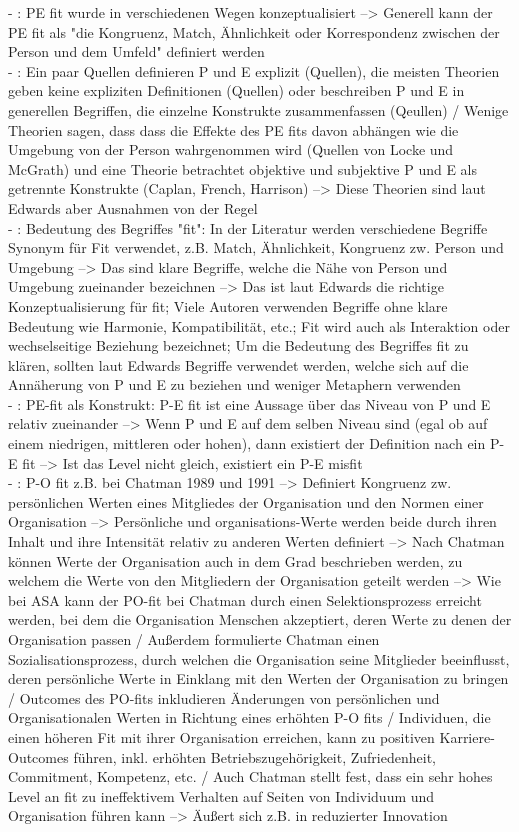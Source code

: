 - \cite[S. 3]{edwards:2007}: PE fit wurde in verschiedenen Wegen konzeptualisiert --> Generell kann der PE fit als "die Kongruenz, Match, Ähnlichkeit oder Korrespondenz zwischen der Person und dem Umfeld" definiert werden\\
- \cite[S. 49]{edwards:2008}: Ein paar Quellen definieren P und E explizit (Quellen), die meisten Theorien geben keine expliziten Definitionen (Quellen) oder beschreiben P und E in generellen Begriffen, die einzelne Konstrukte zusammenfassen (Qeullen) / Wenige Theorien sagen, dass dass die Effekte des PE fits davon abhängen wie die Umgebung von der Person wahrgenommen wird (Quellen von Locke und McGrath) und eine Theorie betrachtet objektive und subjektive P und E als getrennte Konstrukte (Caplan, French, Harrison) --> Diese Theorien sind laut Edwards aber Ausnahmen von der Regel \\
- \cite[S. 53]{edwards:2008}: Bedeutung des Begriffes "fit": In der Literatur werden verschiedene Begriffe Synonym für Fit verwendet, z.B. Match, Ähnlichkeit, Kongruenz zw. Person und Umgebung --> Das sind klare Begriffe, welche die Nähe von Person und Umgebung zueinander bezeichnen --> Das ist laut Edwards die richtige Konzeptualisierung für fit; Viele Autoren verwenden Begriffe ohne klare Bedeutung wie Harmonie, Kompatibilität, etc.; Fit wird auch als Interaktion oder wechselseitige Beziehung bezeichnet; Um die Bedeutung des Begriffes fit zu klären, sollten laut Edwards Begriffe verwendet werden, welche sich auf die Annäherung von P und E zu beziehen und weniger Metaphern verwenden \\
- \cite[S. 53]{edwards:2008}: PE-fit als Konstrukt: P-E fit ist eine Aussage über das Niveau von P und E relativ zueinander --> Wenn P und E auf dem selben Niveau sind (egal ob auf einem niedrigen, mittleren oder hohen), dann existiert der Definition nach ein P-E fit --> Ist das Level nicht gleich, existiert ein P-E misfit \\
- \cite[S. 4]{su:2015}: P-O fit z.B. bei Chatman 1989 und 1991 --> Definiert Kongruenz zw. persönlichen Werten eines Mitgliedes der Organisation und den Normen einer Organisation --> Persönliche und organisations-Werte werden beide durch ihren Inhalt und ihre Intensität relativ zu anderen Werten definiert --> Nach Chatman können Werte der Organisation auch in dem Grad beschrieben werden, zu welchem die Werte von den Mitgliedern der Organisation geteilt werden --> Wie bei ASA kann der PO-fit bei Chatman durch einen Selektionsprozess erreicht werden, bei dem die Organisation Menschen akzeptiert, deren Werte zu denen der Organisation passen / Außerdem formulierte Chatman einen Sozialisationsprozess, durch welchen die Organisation seine Mitglieder beeinflusst, deren persönliche Werte in Einklang mit den Werten der Organisation zu bringen / Outcomes des PO-fits inkludieren Änderungen von persönlichen und Organisationalen Werten in Richtung eines erhöhten P-O fits / Individuen, die einen höheren Fit mit ihrer Organisation erreichen, kann zu positiven Karriere-Outcomes führen, inkl. erhöhten Betriebszugehörigkeit, Zufriedenheit, Commitment, Kompetenz, etc. / Auch Chatman stellt fest, dass ein sehr hohes Level an fit zu ineffektivem Verhalten auf Seiten von Individuum und Organisation führen kann --> Äußert sich z.B. in reduzierter Innovation \\
